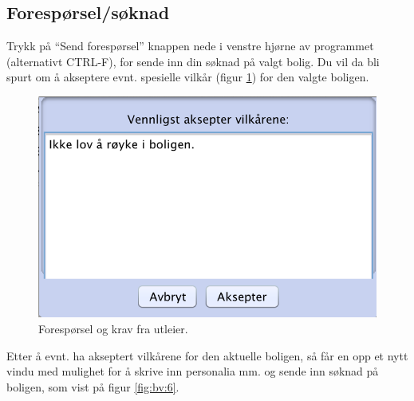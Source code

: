 \subsection{Forespørsel/søknad}
Trykk på “Send forespørsel” knappen nede i venstre hjørne av programmet (alternativt CTRL-F),
for sende inn din søknad på valgt bolig. Du vil da bli spurt om å akseptere evnt. spesielle vilkår
(figur \ref{fig:bv:5}) for den valgte boligen.

\begin{figure}[h!]
\center
 \includegraphics[scale=0.7]{./img/brukerveiledning/5.png}
 \caption{Forespørsel og krav fra utleier.}
 \label{fig:bv:5}
\end{figure}


Etter å evnt. ha akseptert vilkårene for den aktuelle boligen, så får en opp et nytt vindu med
mulighet for å skrive inn personalia mm. og sende inn søknad på boligen, som vist på figur \ref{fig:bv:6}.


